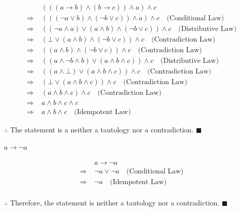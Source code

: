 \documentclass[]{article}
\begin{document}
\begin{align*}
    & (((a \rightarrow b) \land (b \rightarrow c)) \land a) \land c \\
    \Rightarrow\; & (((\neg a \lor b) \land (\neg b \lor c)) \land a) \land c \quad \text{(Conditional Law)} \\
    \Rightarrow\; & ((\neg a \land a) \lor (a\land b) \land (\neg b \lor c)) \land c \quad \text{(Distributive Law)} \\
    \Rightarrow\; & (\bot \lor (a\land b) \land (\neg b \lor c)) \land c \quad \text{(Contradiction Law)} \\
    \Rightarrow\; & ((a\land b) \land (\neg b \lor c)) \land c \quad \text{(Contradiction Law)} \\
    \Rightarrow\; & ((a \land \neg b \land b) \lor (a \land b \land c)) \land  c \quad \text{(Distributive Law)} \\
    \Rightarrow\; & ((a \land \bot) \lor (a\land b\land c)) \land  c \quad \text{(Contradiction Law)} \\
    \Rightarrow\; & (\bot \lor (a\land b\land c)) \land c \quad \text{(Contradiction Law)} \\
    \Rightarrow\; & (a\land b\land c) \land c \quad \text{(Contradiction Law)} \\
    \Rightarrow\; & a \land b \land c \land c \quad \\
    \Rightarrow\; & a \land b \land c \quad \text{(Idempotent Law)}
\end{align*}
\begin{center}
    $\therefore$ The statement is a neither a tautology nor a contradiction. $\blacksquare$
\end{center}

\begin{question}
    $a \rightarrow \neg a$
\end{question}
\begin{align*}
    & a \rightarrow \neg a \\
    \Rightarrow\; & \neg a \lor \neg a \quad \text{(Conditional Law)} \\
    \Rightarrow\; & \neg a \quad \text{(Idempotent Law)} \\
\end{align*}
\begin{center}
    $\therefore$ Therefore, the statement is neither a tautology nor a contradiction. $\blacksquare$
\end{center}
\end{document}
